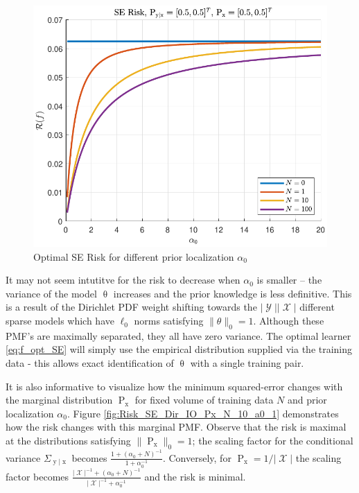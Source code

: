 \documentclass{article}
\DeclareMathOperator{\xrm}{\mathrm{x}}
\DeclareMathOperator{\yrm}{\mathrm{y}}
\DeclareMathOperator{\Prm}{\mathrm{P}}
\DeclareMathOperator{\Xcal}{\mathcal{X}}
\DeclareMathOperator{\Ycal}{\mathcal{Y}}
\begin{document}
\begin{figure}
\centering
\includegraphics[width=1.0\linewidth]{Risk_SE_Dir_IO_a0_leg_N.pdf}
\caption{Optimal SE Risk for different prior localization $\alpha_0$}
\label{fig:Risk_SE_Dir_IO_a0_leg_N}
\end{figure}

It may not seem intutitve for the risk to decrease when $\alpha_0$ is smaller -- the variance of the model $\uptheta$ increases and the prior knowledge is less definitive. This is a result of the Dirichlet PDF weight shifting towards the $|\Ycal||\Xcal|$ different sparse models which have $\ell_0$ norms satisfying $\| \theta \|_0 = 1$. Although these PMF's are maximally separated, they all have zero variance. The optimal learner \eqref{eq:f_opt_SE} will simply use the empirical distribution supplied via the training data - this allows exact identification of $\uptheta$ with a single training pair.

It is also informative to visualize how the minimum squared-error changes with the marginal distribution $\Prm_{\xrm}$ for fixed volume of training data $N$ and prior localization $\alpha_0$. Figure \ref{fig:Risk_SE_Dir_IO_Px_N_10_a0_1} demonstrates how the risk changes with this marginal PMF. Observe that the risk is maximal at the distributions satisfying $\| \Prm_{\xrm} \|_0 = 1$; the scaling factor for the conditional variance $\Sigma_{\yrm | \xrm}$ becomes $\frac{1 + (\alpha_0+N)^{-1}}{1 + \alpha_0^{-1}}$. Conversely, for $\Prm_{\xrm} = 1/|\Xcal|$ the scaling factor becomes $\frac{|\Xcal|^{-1} + (\alpha_0+N)^{-1}}{|\Xcal|^{-1} + \alpha_0^{-1}}$ and the risk is minimal. 
\end{document}
